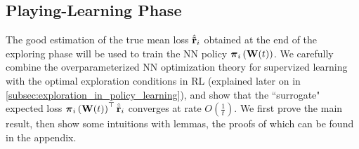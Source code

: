 \subsection{Playing-Learning Phase}
\label{subsec:playing_learning_phase}

The good estimation of the true mean loss $\hat{{\tilde{\mathbf{r}}}}_i$ obtained at the end of the exploring phase will be used to train the NN policy ${\boldsymbol{\pi}}_i\left( {\mathbf{W}}(t) \right)$. We carefully combine the overparameterized NN optimization theory for supervized learning \citep{li2018learning,allen2018convergenceB} with the optimal exploration conditions in RL (explained later on in \cref{subsec:exploration_in_policy_learning}), and show that the ``surrogate" expected loss ${\boldsymbol{\pi}}_i\left( {\mathbf{W}}(t) \right)^\top \hat{{\tilde{\mathbf{r}}}}_i$ converges at rate $O\left(\frac{1}{t} \right)$. We first prove the main result, then show some intuitions with lemmas, the proofs of which can be found in the appendix.

